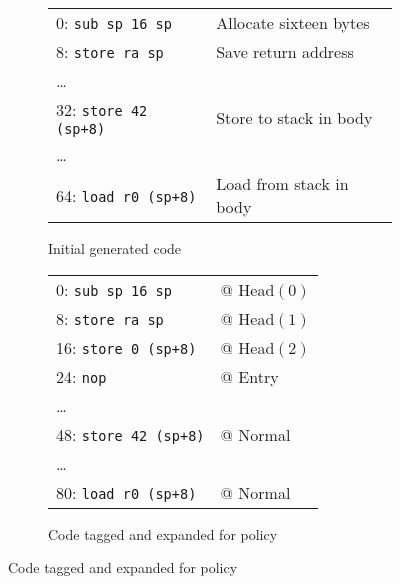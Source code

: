 \documentclass{report}
\begin{document}
\begin{figure}
  \begin{subfigure}[t]{0.55\textwidth}
    \vspace{0em}
    \begin{tabular}{l l}
      0: {\tt sub sp 16 sp} & Allocate sixteen bytes \\
      8: {\tt store ra sp} & Save return address \\
      \dots \\
      32: {\tt store 42 (sp+8)} & Store to stack in body \\
      \dots \\
      64: {\tt load r0 (sp+8)} & Load from stack in body \\
    \end{tabular}
    \caption{Initial generated code}
    \label{ex:call1}
  \end{subfigure}
  \begin{subfigure}[t]{0.45\textwidth}
    \vspace{0em}
    \begin{tabular}{l l}
      0: {\tt sub sp 16 sp} & @ {\sc Head}\((0)\) \\
      8: {\tt store ra sp} & @ {\sc Head}\((1)\) \\
      16: {\tt store 0 (sp+8)} & @ {\sc Head}\((2)\) \\
      24: {\tt nop} & @ {\sc Entry} \\
      \dots \\
      48: {\tt store 42 (sp+8)} & @ {\sc Normal} \\
      \dots \\
      80: {\tt load r0 (sp+8)} & @ {\sc Normal} \\
    \end{tabular}
    \caption{Code tagged and expanded for policy}
    \label{ex:call2}
  \end{subfigure}

  \vspace{\belowdisplayskip}
  

\end{figure}
\end{document}
